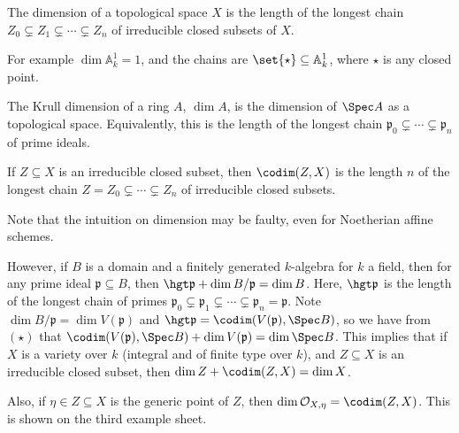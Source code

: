 The dimension of a topological space $X$ is the length of the longest chain
$Z_0 \subsetneq Z_1 \subsetneq \cdots \subsetneq Z_n$ of irreducible closed
subsets of $X$.

For example $\dim \mathbb{A}^1_k = 1$, and the chains are $\set{\star} \subseteq \mathbb{A}_k^1$,
where $\star$ is any closed point.

The Krull dimension of a ring $A$, $\dim A$, is the dimension of $\Spec A$ as a topological
space. Equivalently, this is the length of the longest chain
$\mathfrak{p}_0\subsetneq \cdots \subsetneq \mathfrak{p}_n$ of prime ideals.

If $Z \subseteq X$ is an irreducible closed subset, then $\codim(Z, X)$ is the length
$n$ of the longest chain $Z = Z_0 \subsetneq \cdots \subsetneq Z_n$ of irreducible closed
subsets.

Note that the intuition on dimension may be faulty, even for Noetherian affine
schemes.

However, if $B$ is a domain and a finitely generated $k$-algebra for $k$ a field,
then for any prime ideal $\mathfrak{p} \subseteq B$, then $\hgt \mathfrak{p} + \dim B/\mathfrak{p} = \dim B$.
Here, $\hgt \mathfrak{p}$ is the length of the longest chain of primes
$\mathfrak{p}_0 \subsetneq \mathfrak{p}_1 \subsetneq \cdots \subsetneq \mathfrak{p}_n = \mathfrak{p}$.
Note $\dim B/\mathfrak{p} = \dim V(\mathfrak{p})$ and $\hgt \mathfrak{p} = \codim(V(\mathfrak{p}), \Spec B)$,
so we have from $(\star)$ that $\codim(V(\mathfrak{p}), \Spec B) + \dim V(\mathfrak{p}) = \dim \Spec B$.
This implies that if $X$ is a variety over $k$ (integral and of finite type over $k$), and $Z \subseteq X$
is an irreducible closed subset, then
$\dim Z + \codim(Z, X) = \dim X$.

Also, if $\eta \in Z \subseteq X$ is the generic point of $Z$, then $\dim \mathcal{O}_{X, \eta} = \codim(Z, X)$.
This is shown on the third example sheet.
